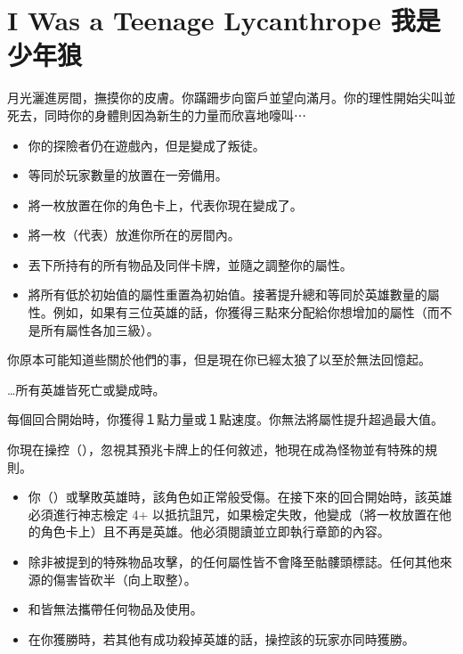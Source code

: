 
\chapter{I Was a Teenage Lycanthrope 我是少年狼}

\begin{HauntStory}

  月光灑進房間，撫摸你的皮膚。你蹣跚步向窗戶並望向滿月。你的理性開始尖叫並死去，同時你的身體則因為新生的力量而欣喜地嚎叫⋯
\end{HauntStory}

\vspace*{-1em}
\begin{itemize}
  \item 你的探險者仍在遊戲內，但是變成了叛徒。
  \item 等同於玩家數量的放置在一旁備用。
  \item 將一枚放置在你的角色卡上，代表你現在變成了。
  \item 將一枚（代表）放進你所在的房間內。
  \item 丟下所持有的所有物品及同伴卡牌，並隨之調整你的屬性。
  \item 將所有低於初始值的屬性重置為初始值。接著提升總和等同於英雄數量的屬性。例如，如果有三位英雄的話，你獲得三點來分配給你想增加的屬性（而不是所有屬性各加三級）。
\end{itemize}


你原本可能知道些關於他們的事，但是現在你已經太狼了以至於無法回憶起。

…所有英雄皆死亡或變成時。

每個回合開始時，你獲得１點力量或１點速度。你無法將屬性提升超過最大值。

\vfill\null\pagebreak


你現在操控（），忽視其預兆卡牌上的任何敘述，牠現在成為怪物並有特殊的規則。

\vspace*{-1em}
\begin{itemize}
  \item 你（）或擊敗英雄時，該角色如正常般受傷。在接下來的回合開始時，該英雄必須進行神志檢定 4+ 以抵抗詛咒，如果檢定失敗，他變成（將一枚放置在他的角色卡上）且不再是英雄。他必須閱讀並立即執行章節的內容。
  \item 除非被提到的特殊物品攻擊，的任何屬性皆不會降至骷髏頭標誌。任何其他來源的傷害皆砍半（向上取整）。
  \item {}和皆無法攜帶任何物品及使用。
  \item 在你獲勝時，若其他有成功殺掉英雄的話，操控該的玩家亦同時獲勝。
\end{itemize}

